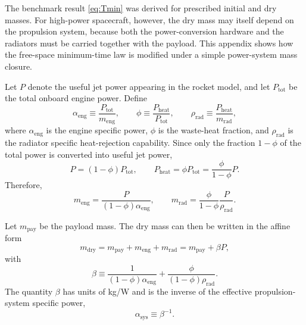 \documentclass[journal,a4paper]{IEEEtran}
\begin{document}
The benchmark result \eqref{eq:Tmin} was derived for prescribed initial and dry masses.
For high-power spacecraft, however, the dry mass may itself depend on the propulsion system, because both the power-conversion hardware and the radiators must be carried together with the payload.
This appendix shows how the free-space minimum-time law is modified under a simple power-system mass closure.

Let \(P\) denote the useful jet power appearing in the rocket model, and let \(P_\mathrm{tot}\) be the total onboard engine power.
Define
\begin{equation}
  \alpha_\mathrm{eng} \equiv \frac{P_\mathrm{tot}}{m_\mathrm{eng}},
  \qquad
  \phi \equiv \frac{P_\mathrm{heat}}{P_\mathrm{tot}},
  \qquad
  \rho_\mathrm{rad} \equiv \frac{P_\mathrm{heat}}{m_\mathrm{rad}},
\end{equation}
where \(\alpha_\mathrm{eng}\) is the engine specific power, \(\phi\) is the waste-heat fraction, and \(\rho_\mathrm{rad}\) is the radiator specific heat-rejection capability.
Since only the fraction \(1-\phi\) of the total power is converted into useful jet power,
\begin{equation}
  P = (1-\phi)P_\mathrm{tot},
  \qquad
  P_\mathrm{heat} = \phi P_\mathrm{tot}
  = \frac{\phi}{1-\phi}P.
\end{equation}
Therefore,
\begin{equation}
  m_\mathrm{eng}=\frac{P}{(1-\phi)\alpha_\mathrm{eng}},
  \qquad
  m_\mathrm{rad}=\frac{\phi}{1-\phi}\frac{P}{\rho_\mathrm{rad}}.
\end{equation}

Let \(m_\mathrm{pay}\) be the payload mass.
The dry mass can then be written in the affine form
\begin{equation}
  m_\mathrm{dry}=m_\mathrm{pay}+m_\mathrm{eng}+m_\mathrm{rad}
  = m_\mathrm{pay}+\beta P,
  \label{eq:mdry_beta_app}
\end{equation}
with
\begin{equation}
  \beta \equiv
  \frac{1}{(1-\phi)\alpha_\mathrm{eng}}
  +\frac{\phi}{(1-\phi)\rho_\mathrm{rad}}.
  \label{eq:beta_def_app}
\end{equation}
The quantity \(\beta\) has units of kg/W and is the inverse of the effective propulsion-system specific power,
\begin{equation}
  \alpha_\mathrm{sys}\equiv \beta^{-1}.
\end{equation}
\end{document}
